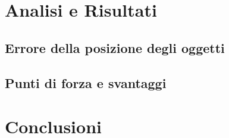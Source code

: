 \section{Analisi e Risultati}

\subsection{Errore della posizione degli oggetti}
\subsection{Punti di forza e svantaggi}

\section{Conclusioni}


